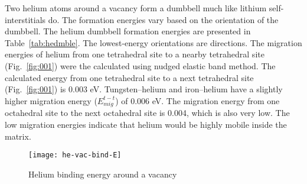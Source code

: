 Two helium atoms around a vacancy form a dumbbell much like lithium self-interstitials do. The formation energies vary based on the orientation of the dumbbell. The helium dumbbell formation energies are presented in Table~\ref{tab:hedmble}. The lowest-energy orientations are  directions. The migration energies of helium from one tetrahedral site to a nearby tetrahedral site (Fig.~\ref{fig:001}) were the calculated using nudged elastic band method. The calculated energy from one tetrahedral site to a next tetrahedral site (Fig.~\ref{fig:001}) is 0.003 eV. Tungsten--helium and iron--helium have a slightly higher migration energy ($E_{mig}^{t-t}$) of 0.006 eV. The migration energy from one octahedral site to the next octahedral site is 0.004, which is also very low. The low migration energies indicate that helium would be highly mobile inside the matrix.


\begin{figure}
\centering
\texttt{[image: he-vac-bind-E]}
\caption{Helium binding energy around a vacancy}
\label{fig:he-bind}
\end{figure}


\clearpage


%
